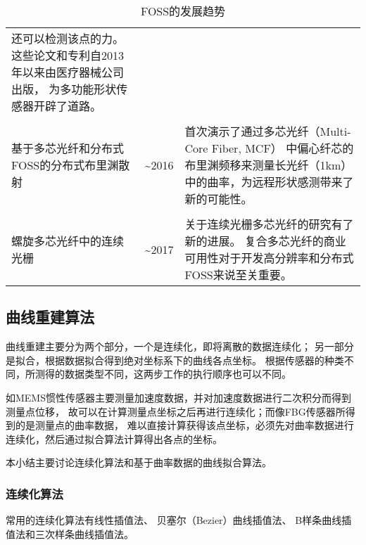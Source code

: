 \begin{table}[!htbp]
\begin{center}
\begin{tabular}{p{}cp{}}
还可以检测该点的力。这些论文和专利自2013年以来由医疗器械公司出版，
为多功能形状传感器开辟了道路。
\\
\\
基于多芯光纤和分布式FOSS的分布式布里渊散射 & \textasciitilde 2016 & 首次演示了通过多芯光纤（Multi-Core Fiber, MCF）
中偏心纤芯的布里渊频移来测量长光纤（1km）中的曲率，为远程形状感测带来了新的可能性。
\\
\\
螺旋多芯光纤中的连续光栅 & \textasciitilde 2017 & 关于连续光栅多芯光纤的研究有了新的进展。
复合多芯光纤的商业可用性对于开发高分辨率和分布式FOSS来说至关重要。
\\
\bottomrule
\end{tabular}
\caption{FOSS的发展趋势}
\end{center}
\end{table}

\subsection{曲线重建算法}
曲线重建主要分为两个部分，一个是连续化，即将离散的数据连续化；
另一部分是拟合，根据数据拟合得到绝对坐标系下的曲线各点坐标。
根据传感器的种类不同，所测得的数据类型不同，这两步工作的执行顺序也可以不同。

如MEMS惯性传感器主要测量加速度数据，并对加速度数据进行二次积分而得到测量点位移，
故可以在计算测量点坐标之后再进行连续化；而像FBG传感器所得到的是测量点的曲率数据，
难以直接计算获得该点坐标，必须先对曲率数据进行连续化，然后通过拟合算法计算得出各点的坐标。

本小结主要讨论连续化算法和基于曲率数据的曲线拟合算法。

\subsubsection{连续化算法}

常用的连续化算法有线性插值法、
贝塞尔（Bezier）曲线插值法、
B样条曲线插值法和三次样条曲线插值法。

